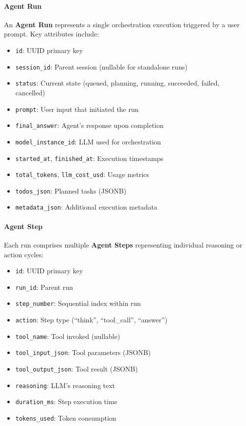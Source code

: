 \paragraph{Agent Run}
An \textbf{Agent Run} represents a single orchestration execution triggered by a user prompt. Key attributes include:
\begin{itemize}
    \item \texttt{id}: UUID primary key
    \item \texttt{session\_id}: Parent session (nullable for standalone runs)
    \item \texttt{status}: Current state (queued, planning, running, succeeded, failed, cancelled)
    \item \texttt{prompt}: User input that initiated the run
    \item \texttt{final\_answer}: Agent's response upon completion
    \item \texttt{model\_instance\_id}: LLM used for orchestration
    \item \texttt{started\_at}, \texttt{finished\_at}: Execution timestamps
    \item \texttt{total\_tokens}, \texttt{llm\_cost\_usd}: Usage metrics
    \item \texttt{todos\_json}: Planned tasks (JSONB)
    \item \texttt{metadata\_json}: Additional execution metadata
\end{itemize}

\paragraph{Agent Step}
Each run comprises multiple \textbf{Agent Steps} representing individual reasoning or action cycles:
\begin{itemize}
    \item \texttt{id}: UUID primary key
    \item \texttt{run\_id}: Parent run
    \item \texttt{step\_number}: Sequential index within run
    \item \texttt{action}: Step type (``think'', ``tool\_call'', ``answer'')
    \item \texttt{tool\_name}: Tool invoked (nullable)
    \item \texttt{tool\_input\_json}: Tool parameters (JSONB)
    \item \texttt{tool\_output\_json}: Tool result (JSONB)
    \item \texttt{reasoning}: LLM's reasoning text
    \item \texttt{duration\_ms}: Step execution time
    \item \texttt{tokens\_used}: Token consumption
\end{itemize}

